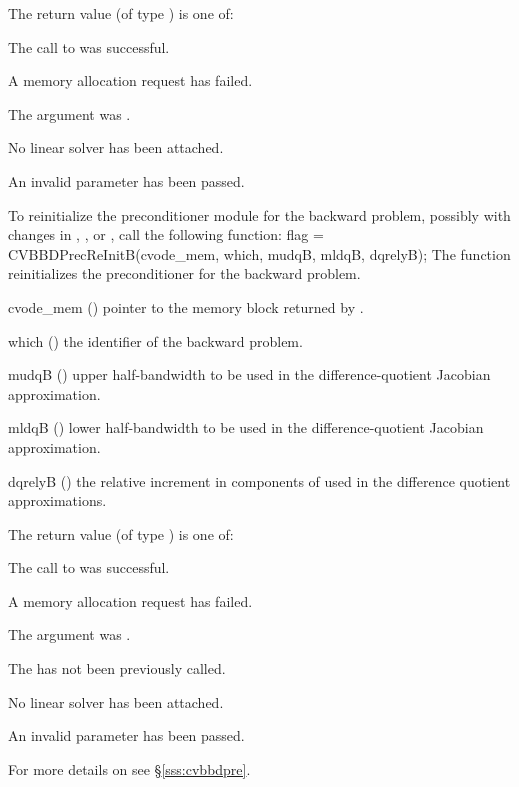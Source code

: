 {
  The return value  (of type ) is one of:
  \begin{args}
  \item[\Id{CVLS\_SUCCESS}]
    The call to  was successful.
  \item[\Id{CVLS\_MEM\_FAIL}]
    A memory allocation request has failed.
  \item[\Id{CVLS\_MEM\_NULL}]
    The  argument was .
  \item[\Id{CVLS\_LMEM\_NULL}]
    No linear solver has been attached.
  \item[\Id{CVLS\_ILL\_INPUT}]
    An invalid parameter has been passed.
  \end{args}
}
{}
To reinitialize the {\cvbbdpre} preconditioner module for the backward problem,
possibly with changes in , , or , call the following
function:
{
  flag = CVBBDPrecReInitB(cvode\_mem, which, mudqB, mldqB, dqrelyB);
}
{
  The function  reinitializes the {\cvbbdpre} preconditioner
  for the backward problem.
}
{
  \begin{args}
  \item[cvode\_mem] ()
    pointer to the {\cvodes} memory block returned by .
  \item[which] ()
    the identifier of the backward problem.
  \item[mudqB] ()
    upper half-bandwidth to be used in the difference-quotient Jacobian approximation.
  \item[mldqB] ()
    lower half-bandwidth to be used in the difference-quotient Jacobian approximation.
  \item[dqrelyB] ()
    the relative increment in components of  used in the difference quotient
    approximations.
  \end{args}
}
{
  The return value  (of type ) is one of:
  \begin{args}
  \item[\Id{CVLS\_SUCCESS}]
    The call to  was successful.
  \item[\Id{CVLS\_MEM\_FAIL}]
    A memory allocation request has failed.
  \item[\Id{CVLS\_MEM\_NULL}]
    The  argument was .
  \item[\Id{CVLS\_PMEM\_NULL}]
    The  has not been previously called.
  \item[\Id{CVLS\_LMEM\_NULL}]
    No linear solver has been attached.
  \item[\Id{CVLS\_ILL\_INPUT}]
    An invalid parameter has been passed.
  \end{args}
}
{}
For more details on {\cvbbdpre} see \S\ref{sss:cvbbdpre}.


